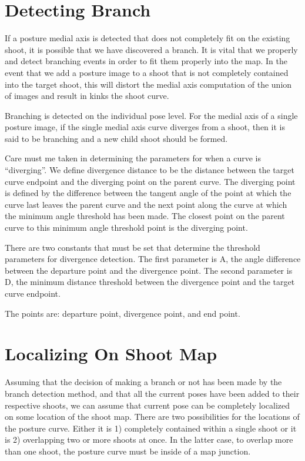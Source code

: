 \section{Detecting Branch}
\label{detectingbranch}

If a posture medial axis is detected that does not completely fit on the existing shoot, it is possible that we have discovered a branch. It is vital that we properly and detect branching events in order to fit them properly into the map. In the event that we add a posture image to a shoot that is not completely contained into the target shoot, this will distort the medial axis computation of the union of images and result in kinks the shoot curve. 

Branching is detected on the individual pose level. For the medial axis of a single posture image, if the single medial axis curve diverges from a shoot, then it is said to be branching and a new child shoot should be formed.

Care must me taken in determining the parameters for when a curve is “diverging”. We define divergence distance to be the distance between the target curve endpoint and the diverging point on the parent curve. The diverging point is defined by the difference between the tangent angle of the point at which the curve last leaves the parent curve and the next point along the curve at which the minimum angle threshold has been made. The closest point on the parent curve to this minimum angle threshold point is the diverging point.

There are two constants that must be set that determine the threshold parameters for divergence detection. The first parameter is A, the angle difference between the departure point and the divergence point. The second parameter is D, the minimum distance threshold between the divergence point and the target curve endpoint.

The points are: departure point, divergence point, and end point.

\section{Localizing On Shoot Map}
\label{localizingonshootmap}

Assuming that the decision of making a branch or not has been made by the branch detection method, and that all the current poses have been added to their respective shoots, we can assume that current pose can be completely localized on some location of the shoot map. There are two possibilities for the locations of the posture curve. Either it is 1) completely contained within a single shoot or it is 2) overlapping two or more shoots at once. In the latter case, to overlap more than one shoot, the posture curve must be inside of a map junction. 

